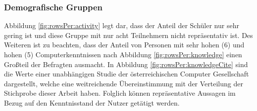 \documentclass[a4paper]{article}
\begin{document}
            \subsubsection{Demografische Gruppen}\label{section:demographic_groups}
                Abbildung \ref{fig:rowsPer:activity} legt dar, dass der Anteil der Schüler nur sehr gering ist und diese Gruppe mit nur acht Teilnehmern nicht repräsentativ ist. Des Weiteren ist zu beachten, dass der Anteil von Personen mit sehr hohen (6) und hohen (5) Computerkenntnissen nach Abbildung \ref{fig:rowsPer:knowledge} einen Großteil der Befragten ausmacht. In Abbildung \ref{fig:rowsPer:knowledgeCite} sind die Werte einer unabhängigen Studie der österreichischen Computer Gesellschaft\cite{demographicDistributionKnowledge} dargestellt, welche eine weitreichende Übereinstimmung mit der Verteilung der Stichprobe dieser Arbeit haben. Folglich können repräsentative Aussagen im Bezug auf den Kenntnisstand der Nutzer getätigt werden.
            
\end{document}
